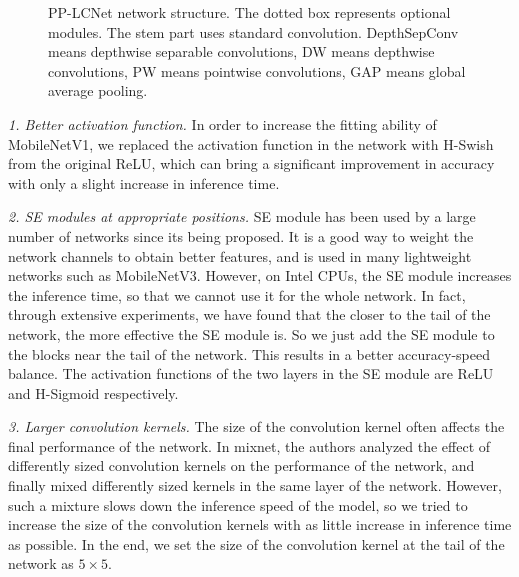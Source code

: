 \documentclass[letterpaper]{article} %
\begin{document}
\begin{figure}[h!]
\centering
{}
\caption{PP-LCNet network structure. The dotted box represents optional modules. The stem part uses standard convolution.  DepthSepConv means depthwise separable convolutions, DW means depthwise convolutions, PW means pointwise convolutions, GAP means global average pooling.}
\label{PP-LCNet}
\end{figure}
 
\textit{1. Better activation function.}
In order to increase the fitting ability of MobileNetV1, we replaced the activation function in the network with H-Swish from the original ReLU, which can bring a significant improvement in accuracy with only a slight increase in inference time.

\textit{2. SE modules at appropriate positions.}
SE \cite{Hu_2018_CVPR} module has been used by a large number of networks since its being proposed. It is a good way to weight the network channels to obtain better features, and is used in many lightweight networks such as MobileNetV3\cite{Howard_2019_ICCV}. However, on Intel CPUs, the SE module increases the inference time, so that we cannot use it for the whole network. In fact, through extensive experiments, we have found that the closer to the tail of the network, the more effective the SE module is. So we just add the SE module to the blocks near the tail of the network. This results in a better accuracy-speed balance. The activation functions of the two layers in the SE module are ReLU and H-Sigmoid respectively.

\textit{3. Larger convolution kernels.}
The size of the convolution kernel often affects the final performance of the network. In mixnet\cite{1907.09595}, the authors analyzed the effect of differently sized convolution kernels on the performance of the network, and finally mixed differently sized kernels in the same layer of the network. However, such a mixture slows down the inference speed of the model, so we tried to increase the size of the convolution kernels with as little increase in inference time as possible. In the end, we set the size of the convolution kernel at the tail of the network as $5 \times 5$.
\end{document}
